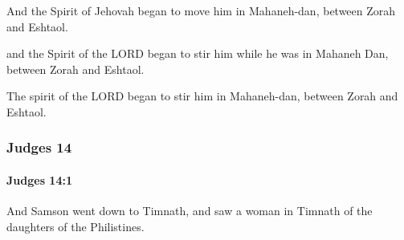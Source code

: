 			\begin{versebox}
					\item[BHS] 
					\item[ASV] And the Spirit of Jehovah began to move him in Mahaneh-dan, between Zorah and Eshtaol.
					\item[NIV] and the Spirit of the LORD began to stir him while he was in Mahaneh Dan, between Zorah and Eshtaol.
					\item[NRSV] The spirit of the LORD began to stir him in Mahaneh-dan, between Zorah and Eshtaol.
			\end{versebox}
	\subsubsection{Judges 14} %
		\label{JUDGES-14}

		\paragraph{Judges 14:1} %
			\label{JUDGES-14-1}

			And Samson went down to Timnath, and saw a woman in Timnath of the daughters of the Philistines.

